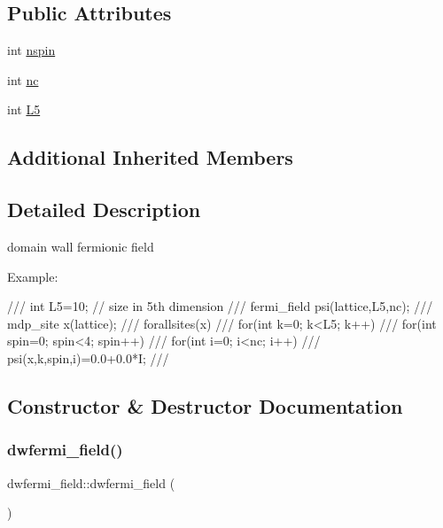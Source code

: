 \subsection*{Public Attributes}
\begin{DoxyCompactItemize}
\item 
int \hyperlink{classdwfermi__field_ac56aca6bd128b92467fdf7dca86535aa}{nspin}
\item 
int \hyperlink{classdwfermi__field_ab4c38d0b9f1016a5b121eced43a19370}{nc}
\item 
int \hyperlink{classdwfermi__field_a8bb8d2f33c7060b39da0563969b712a9}{L5}
\end{DoxyCompactItemize}
\subsection*{Additional Inherited Members}


\subsection{Detailed Description}
domain wall fermionic field 

Example\+: \begin{DoxyVerb}/// int L5=10; // size in 5th dimension 
/// fermi_field psi(lattice,L5,nc);
/// mdp_site x(lattice);
/// forallsites(x)
///    for(int k=0; k<L5; k++)
///      for(int spin=0; spin<4; spin++)
///        for(int i=0; i<nc; i++)
///          psi(x,k,spin,i)=0.0+0.0*I;
/// \end{DoxyVerb}
 

\subsection{Constructor \& Destructor Documentation}
\mbox{\label{classdwfermi__field_a3463b5fdc91d928f765eb4ee35601672}} 
\subsubsection{\texorpdfstring{dwfermi\+\_\+field()}{dwfermi\_field()}\hspace{0.1cm}{\footnotesize\ttfamily [1/3]}}
{\footnotesize\ttfamily dwfermi\+\_\+field\+::dwfermi\+\_\+field (\begin{DoxyParamCaption}{ }\end{DoxyParamCaption})\hspace{0.3cm}{\ttfamily [inline]}}

